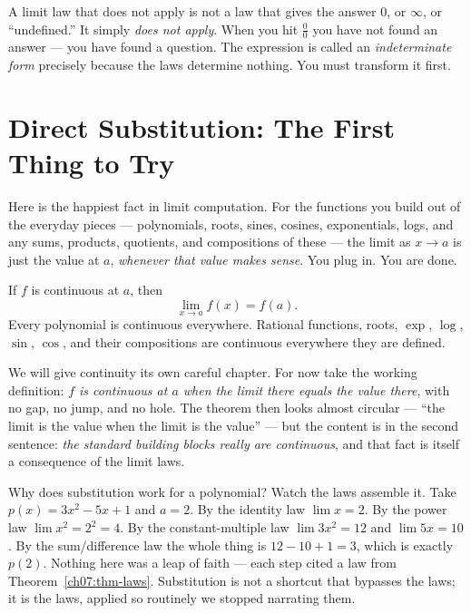 \begin{trapbox}
A limit law that does not apply is not a law that gives the answer $0$, or
$\infty$, or ``undefined.'' It simply \emph{does not apply}. When you hit
$\frac{0}{0}$ you have not found an answer --- you have found a question. The
expression is called an \emph{indeterminate form} precisely because the laws
determine nothing. You must transform it first.
\end{trapbox}

\section{Direct Substitution: The First Thing to Try}
\label{ch07:substitution}

Here is the happiest fact in limit computation. For the functions you build
out of the everyday pieces --- polynomials, roots, sines, cosines,
exponentials, logs, and any sums, products, quotients, and compositions of
these --- the limit as $x\to a$ is just the value at $a$, \emph{whenever that
value makes sense}. You plug in. You are done.

\begin{theorem}
\label{ch07:thm-subst}
If $f$ is continuous at $a$, then
\[
  \lim_{x\to a} f(x) = f(a).
\]
Every polynomial is continuous everywhere. Rational functions, roots,
$\exp$, $\log$, $\sin$, $\cos$, and their compositions are continuous
everywhere they are defined.
\end{theorem}

We will give continuity its own careful chapter. For now take the working
definition: \emph{$f$ is continuous at $a$ when the limit there equals the
value there}, with no gap, no jump, and no hole. The theorem then looks almost
circular --- ``the limit is the value when the limit is the value'' --- but
the content is in the second sentence: \emph{the standard building blocks
really are continuous}, and that fact is itself a consequence of the limit
laws.

\begin{whybox}
Why does substitution work for a polynomial? Watch the laws assemble it. Take
$p(x) = 3x^{2} - 5x + 1$ and $a = 2$. By the identity law $\lim x = 2$. By the
power law $\lim x^{2} = 2^{2} = 4$. By the constant-multiple law
$\lim 3x^{2} = 12$ and $\lim 5x = 10$. By the sum/difference law the whole
thing is $12 - 10 + 1 = 3$, which is exactly $p(2)$. Nothing here was a leap
of faith --- each step cited a law from
Theorem~\ref{ch07:thm-laws}. Substitution is not a shortcut that bypasses the
laws; it is the laws, applied so routinely we stopped narrating them.
\end{whybox}

